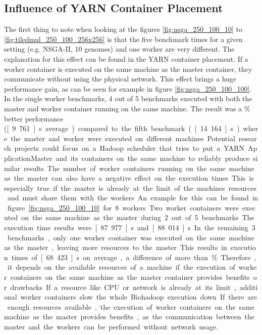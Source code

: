 \subsection{Influence of YARN Container Placement}
The first thing to note when looking at the figures \ref{fig:nsga_250_100_10} to \ref{fig:tiledmul_250_100_256x256} is that the five benchmark times for a given setting (e.g. NSGA-II, 10 genomes) and one worker are very different. The explanation for this effect can be found in the YARN container placement. If a worker container is executed on the same machine as the master container, they communicate without using the physical network. This effect brings a huge performance gain, as can be seen for example in figure \ref{fig:nsga_250_100_100}. In the single worker benchmarks, 4 out of 5 benchmarks executed with both the master and worker container running on the same machine. The result was a \unit[50]{\%} better performance (\unit[9.761]{s} average) compared to the fifth benchmark (\unit[14.164]{s}) where the master and worker were executed on different machines. Potential research projects could focus on a Hadoop scheduler that tries to put a YARN ApplicationMaster and its containers on the same machine to reliably produce similar results.

The number of worker containers running on the same machine as the master can also have a negative effect on the execution times. This is especially true if the master is already at the limit of the machines resources and must share them with the workers. An example for this can be found in figure \ref{fig:nsga_250_100_10} for 8 workers. Two worker containers were executed on the same machine as the master during 2 out of 5 benchmarks. The execution time results were \unit[87.977]{s} and \unit[88.014]{s}. In the remaining 3 benchmarks, only one worker container was executed on the same machine as the master, leaving more resources to the master. This results in execution times of \unit[68.423]{s} on average, a difference of more than \unit[20]{\%}.

Therefore, it depends on the available resources of a machine if the execution of worker containers on the same machine as the master container provides benefits or drawbacks. If a resource like CPU or network is already at its limit, additional worker containers slow the whole Biohadoop execution down. If there are enough resources available, the execution of worker containers on the same machine as the master provides benefits, as the communication between the master and the workers can be performed without network usage.

